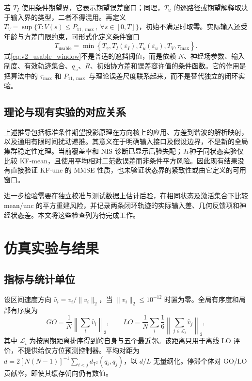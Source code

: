 \documentclass[UTF8,fontset=windows,11pt]{ctexart}
\begin{document}
若 $T_I$ 使用条件期望界，它表示期望误差窗口；同理，$T_u$ 的逐路径或期望解释取决于输入界的类型，二者不得混用。再定义 $T_V=\sup\{T:V(s)\le P_{11,\max},\ \forall s\in[0,T]\}$，初始不满足时取零。实际输入还受年龄与方差门限约束，可形式化定义条件窗口
\begin{equation}
 T_{\mathrm{usable}}
 =\min\left\{T_\gamma,
 T_I(\varepsilon_I),
 T_u(\varepsilon_u),T_V,
 \tau_{\max}\right\}.
 \label{eq:v2_usable_window}
\end{equation}
式\eqref{eq:v2_usable_window}不是普适的遮挡阈值，而是依赖 $N$、神经场参数、输入制度、有效轨迹集合、$q_\omega$、$R$、初始协方差和误差容许值的条件函数。它的作用是把算法中的 $\tau_{\max}$ 和 $P_{11,\max}$ 与理论误差尺度联系起来，而不是替代独立的闭环实验。

\subsection{理论与现有实验的对应关系}

上述推导包括标准条件期望投影原理在方向核上的应用、方差到谐波的解析映射，以及通用有限时间扰动递推。其意义在于明确输入接口及假设边界，不是新的全局集群稳定性定理。当前覆盖率和 NIS 诊断已显示后验失配；五种子同状态实验仅比较 KF-mean，且使用平均相对二范数误差而非条件平方风险。因此现有结果没有直接验证 KF-unc 的 MMSE 性质，也未验证状态界的紧致性或由它定义的可用窗口。

进一步检验需要在独立校准与测试数据上估计后验，在相同状态及激活集合下比较 mean/unc 的平方重建风险，并记录两条闭环轨迹的实际输入差、几何反馈项和神经状态差。本文将这些检查列为待完成工作。

\section{仿真实验与结果}

\subsection{指标与统计单位}
设区间速度方向 $\widehat v_i=v_i/\|v_i\|_2$，当 $\|v_i\|_2\le10^{-12}$ 时置为零。全局有序度和局部有序度为
\begin{equation}
GO=\frac1N\left\|\sum_i\widehat v_i\right\|_2,\qquad
LO=\frac1N\sum_i\frac1{6}\left\|\sum_{j\in\mathcal L_i}\widehat v_j\right\|_2,
\end{equation}
其中 $\mathcal L_i$ 为按周期距离排序得到的自身与五个最近邻。该距离只用于离线 LO 评价，不提供给仅方位预测控制器。平均对距为 $d=2[N(N-1)]^{-1}\sum_{i<j}d_{\mathbb T^2}(q_i,q_j)$，以 $d/L$ 无量纲化。停滞个体对 GO/LO 贡献零，即使其缓存朝向仍有数值。
\end{document}
